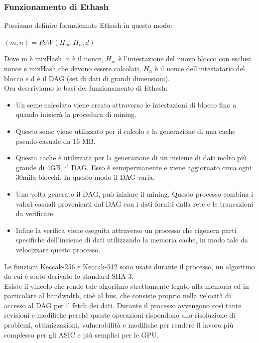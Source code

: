 \documentclass[a4paper,11pt]{report}
\begin{document}
\subsubsection{Funzionamento di Ethash}
Possiamo definire formalemnte Ethash in questo modo:\\
\begin{center}
$ (m,n) = PoW(\textit{H}_{m},\textit{H}_{n},d) $
\end{center}
Dove m è mixHash, n è il nonce, $H_{m}$ è l'intestazione del nuovo blocco con esclusi nonce e mixHash che devono essere calcolati, $H_{n}$ è il nonce dell'intestatario del blocco e d è il DAG (set di dati di grandi dimensioni).\\
Ora descriviamo le basi del funzionamento di Ethash:
\begin{itemize}
\item Un seme calcolato viene creato attraverso le intestazioni di blocco fino a quando inizierà la procedura di mining.
\item  Questo seme viene utilizzato per il calcolo e la generazione di una cache pseudo-casuale da 16 MB.
\item Questa cache è utilizzata per la generazione di un insieme di dati molto più grande di 4GB, il DAG. Esso è semipermanente e viene aggiornato circa ogni 30mila blocchi. In questo modo il DAG varia.
\item Una volta generato il DAG, può iniziare il mining. Questo processo combina i valori casuali provenienti dal DAG con i dati forniti dalla rete e le transazioni da verificare.
\item Infine la verifica viene eseguita attraverso un processo che rigenera parti specifiche dell'insieme di dati utilizzando la memoria cache, in modo tale da velocizzare questo processo.\\
\end{itemize}
Le funzioni Keccak-256 e Keccak-512 sono usate durante il processo, un algoritmo da cui è stato derivato lo standard SHA-3.\\
Esiste il vincolo che rende tale algoritmo strettamente legato alla memoria ed in particolare al bandwidth, cioè al bus, che consiste proprio nella velocità di accesso al DAG per il fetch dei dati.
Durante il processo avvengono così tante revisioni e modifiche perchè queste operazioni rispondono alla risoluzione di problemi, ottimizzazioni, vulnerabilità e modifiche per rendere il lavoro più complesso per gli ASIC e più semplici per le GPU.\\
\newpage
\end{document}
